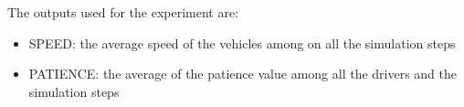 \documentclass[10pt,letterpaper]{article}
\theoremstyle{definition}
\theoremstyle{remark}
\begin{document}
The outputs used for the experiment are:
\begin{itemize}
    \item SPEED: the average speed of the vehicles among on all the simulation steps
    \item PATIENCE: the average of the patience value among all the drivers and the simulation steps
\end{itemize}


%
%
%
%
%
%
%
%
%
%
\end{document}

